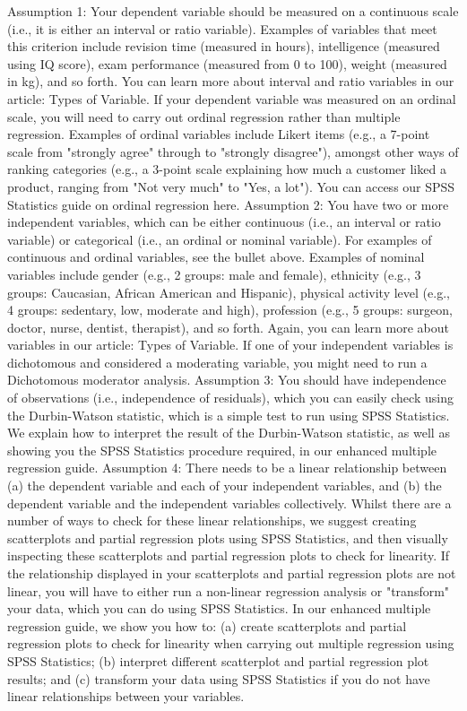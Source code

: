 \documentclass[]{article}
\begin{document}
	Assumption 1: Your dependent variable should be measured on a continuous scale (i.e., it is either an interval or ratio variable). Examples of variables that meet this criterion include revision time (measured in hours), intelligence (measured using IQ score), exam performance (measured from 0 to 100), weight (measured in kg), and so forth. You can learn more about interval and ratio variables in our article: Types of Variable. If your dependent variable was measured on an ordinal scale, you will need to carry out ordinal regression rather than multiple regression. Examples of ordinal variables include Likert items (e.g., a 7-point scale from "strongly agree" through to "strongly disagree"), amongst other ways of ranking categories (e.g., a 3-point scale explaining how much a customer liked a product, ranging from "Not very much" to "Yes, a lot"). You can access our SPSS Statistics guide on ordinal regression here.
	Assumption 2: You have two or more independent variables, which can be either continuous (i.e., an interval or ratio variable) or categorical (i.e., an ordinal or nominal variable). For examples of continuous and ordinal variables, see the bullet above. Examples of nominal variables include gender (e.g., 2 groups: male and female), ethnicity (e.g., 3 groups: Caucasian, African American and Hispanic), physical activity level (e.g., 4 groups: sedentary, low, moderate and high), profession (e.g., 5 groups: surgeon, doctor, nurse, dentist, therapist), and so forth. Again, you can learn more about variables in our article: Types of Variable. If one of your independent variables is dichotomous and considered a moderating variable, you might need to run a Dichotomous moderator analysis.
	Assumption 3: You should have independence of observations (i.e., independence of residuals), which you can easily check using the Durbin-Watson statistic, which is a simple test to run using SPSS Statistics. We explain how to interpret the result of the Durbin-Watson statistic, as well as showing you the SPSS Statistics procedure required, in our enhanced multiple regression guide.
	Assumption 4: There needs to be a linear relationship between (a) the dependent variable and each of your independent variables, and (b) the dependent variable and the independent variables collectively. Whilst there are a number of ways to check for these linear relationships, we suggest creating scatterplots and partial regression plots using SPSS Statistics, and then visually inspecting these scatterplots and partial regression plots to check for linearity. If the relationship displayed in your scatterplots and partial regression plots are not linear, you will have to either run a non-linear regression analysis or "transform" your data, which you can do using SPSS Statistics. In our enhanced multiple regression guide, we show you how to: (a) create scatterplots and partial regression plots to check for linearity when carrying out multiple regression using SPSS Statistics; (b) interpret different scatterplot and partial regression plot results; and (c) transform your data using SPSS Statistics if you do not have linear relationships between your variables.
\end{document}

